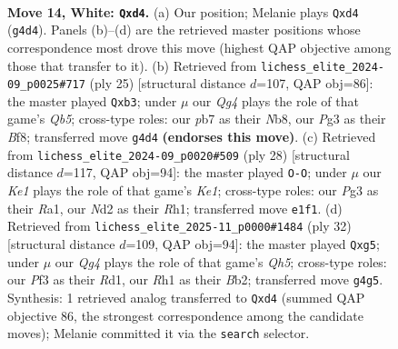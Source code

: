 \documentclass[11pt]{article}
\begin{document}
\clearpage

\begin{figure}[p]\centering
\begin{subfigure}{0.46\textwidth}\centering
\resizebox{\linewidth}{!}{%
\newchessgame
\chessboard[
  setfen={r1b1k2r/pp1nbppp/2n1p3/3pP3/3q2Q1/3B1PP1/P2N3P/R1B1K1NR w KQ - 0 14},
  showmover=false,
  pgfstyle=straightmove, color=movearrow, markmove={g4-d4}
]}
\caption{}
\end{subfigure}\hfill
\begin{subfigure}{0.46\textwidth}\centering
\resizebox{\linewidth}{!}{%
\newchessgame
\chessboard[
  setfen={rn2kb1r/pp3ppb/2p1p2p/7P/1q1P1B2/1QP3N1/PP3PP1/R3KB1R b KQkq - 0 13},
  showmover=false,
  pgfstyle=straightmove, color=movearrow, markmove={b4-b3}
]}
\caption{}
\end{subfigure}
\\[4pt]
\begin{subfigure}{0.46\textwidth}\centering
\resizebox{\linewidth}{!}{%
\newchessgame
\chessboard[
  setfen={2r1kb1r/1p1n1pp1/p2p4/4pP1p/4P1q1/1PN1B1P1/1PP4P/R2QK2R w KQk - 1 15},
  showmover=false,
  pgfstyle=straightmove, color=movearrow, markmove={e1-g1}
]}
\caption{}
\end{subfigure}\hfill
\begin{subfigure}{0.46\textwidth}\centering
\resizebox{\linewidth}{!}{%
\newchessgame
\chessboard[
  setfen={r1b1r1k1/2pp1ppp/2p1n3/p3P1qQ/1b1N4/1PN1R3/PBP2PPP/3R2K1 w - - 12 17},
  showmover=false,
  pgfstyle=straightmove, color=movearrow, markmove={h5-g5}
]}
\caption{}
\end{subfigure}
\caption{\textbf{Move 14, White: \texttt{Qxd4}.} (a) Our position; Melanie plays \texttt{Qxd4} (\texttt{g4d4}). Panels (b)--(d) are the retrieved master positions whose correspondence most drove this move (highest QAP objective among those that transfer to it). (b) Retrieved from \texttt{lichess\_elite\_2024-09\_p0025\#717} (ply 25) [structural distance $d$=107, QAP obj=86]: the master played \texttt{Qxb3}; under $\mu$ our \emph{Qg4} plays the role of that game's \emph{Qb5}; cross-type roles: our \emph{p}b7 as their \emph{N}b8, our \emph{P}g3 as their \emph{B}f8; transferred move \texttt{g4d4} \textbf{(endorses this move)}. (c) Retrieved from \texttt{lichess\_elite\_2024-09\_p0020\#509} (ply 28) [structural distance $d$=117, QAP obj=94]: the master played \texttt{O-O}; under $\mu$ our \emph{Ke1} plays the role of that game's \emph{Ke1}; cross-type roles: our \emph{P}g3 as their \emph{R}a1, our \emph{N}d2 as their \emph{R}h1; transferred move \texttt{e1f1}. (d) Retrieved from \texttt{lichess\_elite\_2025-11\_p0000\#1484} (ply 32) [structural distance $d$=109, QAP obj=94]: the master played \texttt{Qxg5}; under $\mu$ our \emph{Qg4} plays the role of that game's \emph{Qh5}; cross-type roles: our \emph{P}f3 as their \emph{R}d1, our \emph{R}h1 as their \emph{B}b2; transferred move \texttt{g4g5}. Synthesis: 1 retrieved analog transferred to \texttt{Qxd4} (summed QAP objective 86, the strongest correspondence among the candidate moves); Melanie committed it via the \texttt{search} selector.}
\label{fig:thought-m26}
\end{figure}
\end{document}
